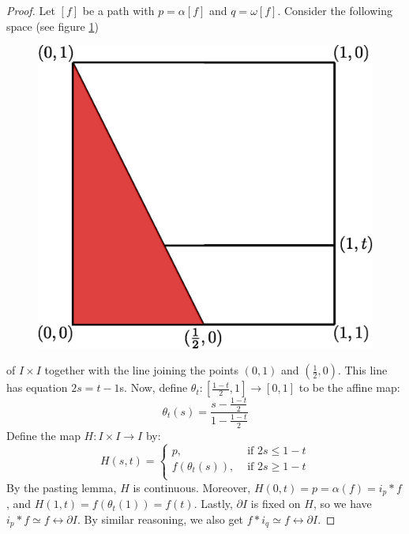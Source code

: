 \begin{proof}
    Let $[f]$ be a path with $p=\alpha[f]$ and $q=\omega[f]$. Consider the
    following space (see figure \ref{fig_4.1})
    \begin{figure}[h]
        \centering
        \includegraphics[scale=0.5]{Figures/Chapter4/path_identity.eps}
        \caption{}
        \label{fig_4.1}
    \end{figure}
    of $I \times I$ together with the line joining the points  $(0,1)$ and
    $(\frac{1}{2},0)$. This line has equation $2s=t-1$s. Now, define
    $\theta_t:[\frac{1-t}{2},1] \xrightarrow{} [0,1]$ to be the affine map:
    \begin{equation*}
        \theta_t(s)=\frac{s-\frac{1-t}{2}}{1-\frac{1-t}{2}}
    \end{equation*}
    Define the map $H:I \times I \xrightarrow{} I$ by:
    \begin{equation*}
       H(s,t)=\begin{cases}
                p, & \text{ if } 2s \leq 1-t    \\
                f(\theta_t(s)), & \text{ if } 2s \geq 1-t   \\
            \end{cases}
    \end{equation*}
    By the pasting lemma, $H$ is continuous. Moreover,  $H(0,t)=p=\alpha(f)=i_p
    \ast f$, and $H(1,t)=f(\theta_t(1))=f(t)$. Lastly, $\partial{I}$ is fixed on
    $H$, so we have $i_p \ast f \simeq f \rel{\partial{I}}$. By similar
    reasoning, we also get $f \ast i_q \simeq f \rel{\partial{I}}$.


\end{proof}
